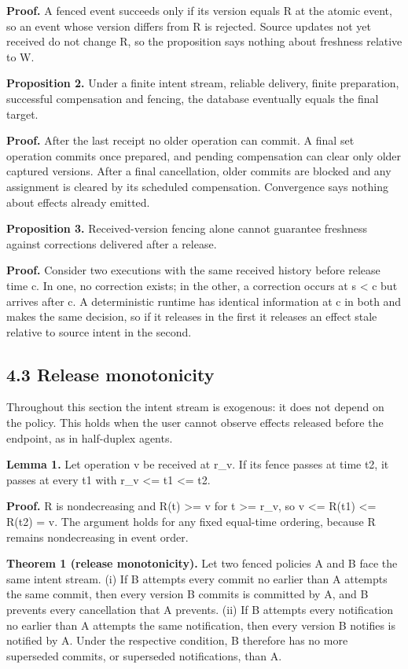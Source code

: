 \documentclass[11pt]{article}
\begin{document}
\textbf{Proof.} A fenced event succeeds only if its version equals R at the atomic event, so an event whose version differs from R is rejected. Source updates not yet received do not change R, so the proposition says nothing about freshness relative to W.


\textbf{Proposition 2.} Under a finite intent stream, reliable delivery, finite preparation, successful compensation and fencing, the database eventually equals the final target.


\textbf{Proof.} After the last receipt no older operation can commit. A final set operation commits once prepared, and pending compensation can clear only older captured versions. After a final cancellation, older commits are blocked and any assignment is cleared by its scheduled compensation. Convergence says nothing about effects already emitted.


\textbf{Proposition 3.} Received-version fencing alone cannot guarantee freshness against corrections delivered after a release.


\textbf{Proof.} Consider two executions with the same received history before release time c. In one, no correction exists; in the other, a correction occurs at s < c but arrives after c. A deterministic runtime has identical information at c in both and makes the same decision, so if it releases in the first it releases an effect stale relative to source intent in the second.


\subsection*{4.3 Release monotonicity}

Throughout this section the intent stream is exogenous: it does not depend on the policy. This holds when the user cannot observe effects released before the endpoint, as in half-duplex agents.


\textbf{Lemma 1.} Let operation v be received at r\_\allowbreak{}v. If its fence passes at time t2, it passes at every t1 with r\_\allowbreak{}v <= t1 <= t2.


\textbf{Proof.} R is nondecreasing and R(t) >= v for t >= r\_\allowbreak{}v, so v <= R(t1) <= R(t2) = v. The argument holds for any fixed equal-time ordering, because R remains nondecreasing in event order.


\textbf{Theorem 1 (release monotonicity).} Let two fenced policies A and B face the same intent stream. (i) If B attempts every commit no earlier than A attempts the same commit, then every version B commits is committed by A, and B prevents every cancellation that A prevents. (ii) If B attempts every notification no earlier than A attempts the same notification, then every version B notifies is notified by A. Under the respective condition, B therefore has no more superseded commits, or superseded notifications, than A.
\end{document}
